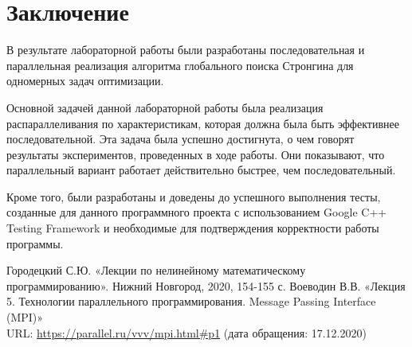 \documentclass{report}
\begin{document}
\section*{Заключение}
В результате лабораторной работы были разработаны последовательная и параллельная реализация алгоритма глобального поиска Стронгина для одномерных задач оптимизации.
\par Основной задачей данной лабораторной работы была реализация распараллеливания по характеристикам, которая должна была быть эффективнее последовательной. Эта задача была успешно достигнута, о чем говорят результаты экспериментов, проведенных в ходе работы. Они показывают, что параллельный вариант работает действительно быстрее, чем последовательный.
\par Кроме того, были разработаны и доведены до успешного выполнения тесты, созданные для данного программного проекта с использованием Google C++ Testing Framework и необходимые для подтверждения корректности работы программы.
\newpage

\begin{thebibliography}{1}
 Городецкий С.Ю. «Лекции по нелинейному математическому программированию». Нижний Новгород, 2020, 154-155 с. 
 Воеводин В.В. «Лекция 5. Технологии параллельного программирования.
Message Passing Interface (MPI)»
\\URL: \url {https://parallel.ru/vvv/mpi.html#p1} (дата обращения: 17.12.2020)
\end{thebibliography}
\newpage

\end{document}
